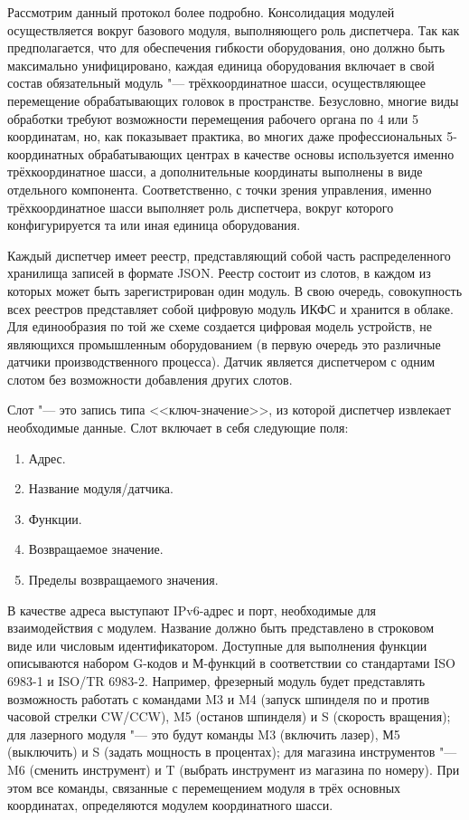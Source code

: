 Рассмотрим данный протокол более подробно. Консолидация модулей осуществляется вокруг базового модуля, выполняющего роль диспетчера. Так как предполагается, что для обеспечения гибкости оборудования, оно должно быть максимально унифицировано, каждая единица оборудования включает в свой состав обязательный модуль "--- трёхкоординатное шасси, осуществляющее перемещение обрабатывающих головок в пространстве. Безусловно, многие виды обработки требуют возможности перемещения рабочего органа по 4 или 5 координатам, но, как показывает практика, во многих даже профессиональных 5-координатных обрабатывающих центрах в качестве основы используется именно трёхкоординатное шасси, а дополнительные координаты выполнены в виде отдельного компонента. Соответственно, с точки зрения управления, именно трёхкоординатное шасси выполняет роль диспетчера, вокруг которого конфигурируется та или иная единица оборудования. 

Каждый диспетчер имеет реестр, представляющий собой часть распределенного хранилища записей в формате JSON. Реестр состоит из слотов, в каждом из которых может быть зарегистрирован один модуль. В свою очередь, совокупность всех реестров представляет собой цифровую модуль ИКФС и хранится в облаке. Для единообразия по той же схеме создается цифровая модель устройств, не являющихся промышленным оборудованием (в первую очередь это различные датчики производственного процесса). Датчик является диспетчером с одним слотом без возможности добавления других слотов.


Слот "--- это запись типа <<ключ-значение>>, из которой диспетчер извлекает необходимые данные. Слот включает в себя следующие поля:

\begin{enumerate}
	\item Адрес.
	\item Название модуля/датчика.
	\item Функции.
	\item Возвращаемое значение.
	\item Пределы возвращаемого значения.
\end{enumerate}

В качестве адреса выступают IPv6-адрес и порт, необходимые для взаимодействия с модулем. Название должно быть представлено в строковом виде или числовым идентификатором. Доступные для выполнения функции описываются набором G-кодов и М-функций в соответствии со стандартами ISO 6983-1 и ISO/TR 6983-2.
Например, фрезерный модуль будет представлять возможность работать с командами M3 и M4 (запуск шпинделя по и против часовой стрелки CW/CCW), M5 (останов шпинделя) и S (скорость вращения); для лазерного модуля "--- это будут команды M3 (включить лазер), М5 (выключить) и S (задать мощность в процентах); для магазина инструментов "--- M6 (сменить инструмент) и T (выбрать инструмент из магазина по номеру).  При этом все команды, связанные с перемещением модуля в трёх основных координатах, определяются модулем координатного шасси.

